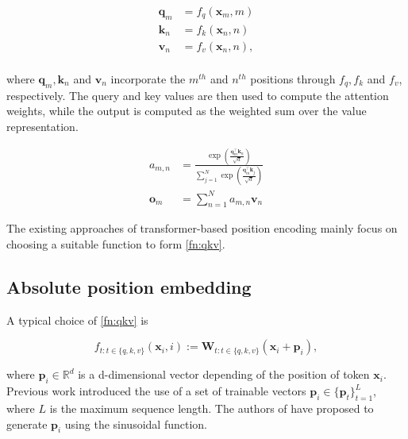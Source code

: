 \begin{equation}
	\begin{aligned}
		{\boldsymbol q}_m &=f_q({\boldsymbol x}_m, m)\\
		{\boldsymbol k}_n &=f_k({\boldsymbol x}_n, n)\\
		{\boldsymbol v}_n &=f_v({\boldsymbol x}_n, n),\\
	\end{aligned}
	\label{fn:qkv}
\end{equation}

where ${\boldsymbol q}_m,{\boldsymbol k}_n$ and $ {\boldsymbol v}_n$ incorporate the $m^{th}$ and $n^{th}$ positions through $f_q,f_k$ and $f_v$, respectively. The query and key values are then used to compute the attention weights, while  the output is computed as the weighted sum over the value representation.

\begin{equation}
	\begin{aligned}
		a_{m,n}&=\frac{\exp(\frac{{\boldsymbol q}_m^{\intercal}{\boldsymbol k}_n}{\sqrt{d}})}{\sum_{j=1}^{N}\exp(\frac{{\boldsymbol q}_m^{\intercal}{\boldsymbol k}_j}{\sqrt{d}})}\\
		\mathbf{o}_m&=\sum_{n=1}^{N}a_{m,n}{\boldsymbol v}_{n}
	\end{aligned}
	\label{fn:attn}
\end{equation}

The existing approaches of transformer-based position encoding mainly focus on choosing a suitable function to form \ref{fn:qkv}.

\subsection{Absolute position embedding} A typical choice of \ref{fn:qkv} is

\begin{equation}
	f_{t:t\in\{q,k,v\}}({\boldsymbol x}_i,i):={\boldsymbol W}_{t:t\in\{q,k,v\}}({\boldsymbol x}_i+{\boldsymbol p}_i),
	\label{fn:adtv-posi}
\end{equation}

where ${\boldsymbol p}_i\in\mathbb{R}^{d}$ is a d-dimensional vector depending of the position of token ${\boldsymbol x}_i$. Previous work \cite{Devlin2019BERTPO,Lan2020ALBERT:2020,clark2020electra,Radford2019LanguageMA,Radford2018ImprovingLU:2018} introduced the use of a set of trainable vectors ${\boldsymbol p}_i\in\{{\boldsymbol p}_t\}_{t=1}^{L}$, where $L$ is the maximum sequence length. The authors of \cite{Vaswani:2017} have proposed to generate ${\boldsymbol p}_i$ using the sinusoidal function.

